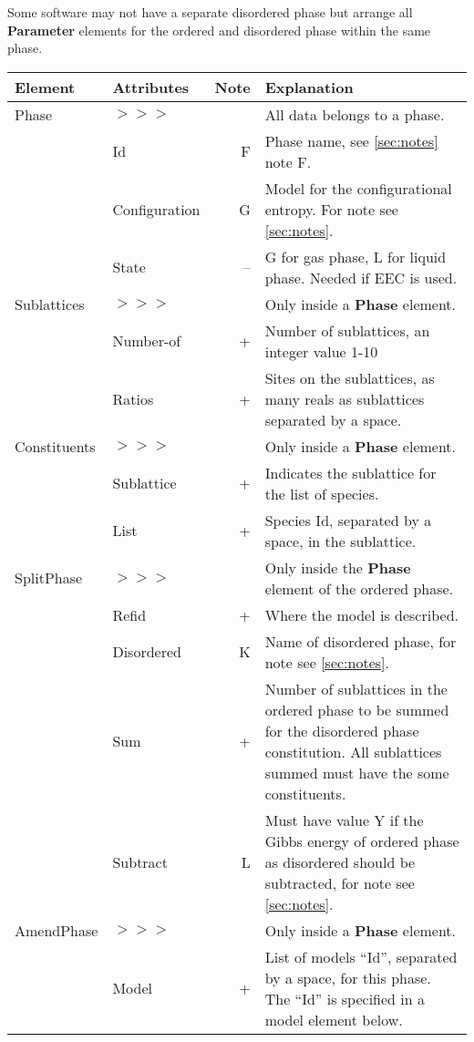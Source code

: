 \documentclass{article}
\begin{document}
Some software may not have a separate disordered phase but arrange all
{\bf Parameter} elements for the ordered and disordered phase within
the same phase.

\begin{tabular}{|p{} p{} r p{}|}\hline
  Element & Attributes & Note & Explanation\\\hline

  Phase &$>>>$&& All data belongs to a phase.\\
       & Id & F & Phase name, see \ref{sec:notes} note F. \\
       & Configuration & G & Model for the configurational entropy.  For note see \ref{sec:notes}.\\
       & State & -- & G for gas phase, L for liquid phase.  Needed if EEC is used.\\\hline

  Sublattices &$>>>$&& Only inside a {\bf Phase} element.\\
        & Number-of & + & Number of sublattices, an integer value 1-10 \\
        & Ratios & + & Sites on the sublattices, as many reals as sublattices separated by a space.\\\hline

  Constituents &$>>>$&& Only inside a {\bf Phase} element.\\
        & Sublattice & + & Indicates the sublattice for the list of species.\\
        & List & + & Species Id, separated by a space, in the sublattice.\\\hline

  SplitPhase &$>>>$&& Only inside the {\bf Phase} element of the ordered phase.\\
      & Refid & + & Where the model is described.\\
      & Disordered & K & Name of disordered phase, for note see \ref{sec:notes}.\\
      & Sum & + & Number of sublattices in the ordered phase to be summed for the disordered phase constitution.  All sublattices summed must have the some constituents.\\
      & Subtract & L & Must have value Y if the Gibbs energy of ordered phase as disordered should be subtracted, for note see \ref{sec:notes}.\\\hline

  AmendPhase &$>>>$&& Only inside a {\bf Phase} element.\\
  & Model & + & List of models ``Id'', separated by a space, for this phase.  The ``Id'' is specified in a model element below.\\\hline
\end{tabular}
\end{document}
